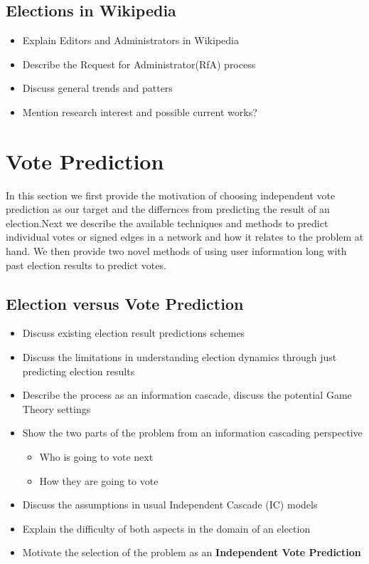 \section{Elections in Wikipedia}
\begin{itemize}
    \item Explain Editors and Administrators in Wikipedia
    \item Describe the Request for Administrator(RfA) process
    \item Discuss general trends and patters
    \item Mention research interest and possible current works?
\end{itemize}

\chapter{Vote Prediction}
In this section we first provide the motivation of choosing independent vote prediction as our target and the differnces from predicting the result of an election.Next we describe the available techniques and methods to predict individual votes or signed edges in a network and how it relates to the problem at hand. We then provide two novel methods of using user information long with past election results to predict votes.

\section{Election versus Vote Prediction}
\begin{itemize}
    \item Discuss existing election result predictions schemes
    \item Discuss the limitations in understanding election dynamics through just predicting election results
    \item Describe the process as an information cascade, discuss the potential Game Theory settings
    \item Show the two parts of the problem from an information cascading perspective 
     \begin{itemize}
        \item Who is going to vote next
        \item How they are going to vote
    \end{itemize}
    \item Discuss the assumptions in usual Independent Cascade (IC) models
    \item Explain the difficulty of both aspects in the domain of an election 
    \item Motivate the selection of the problem as an \textbf{Independent Vote Prediction}
\end{itemize}
